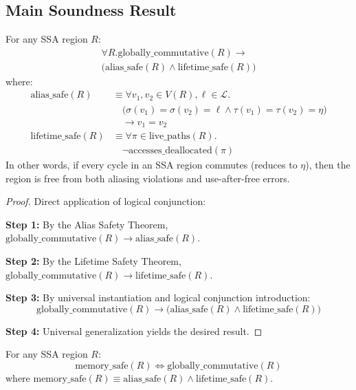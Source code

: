\documentclass[journal]{IEEEtran}
\begin{document}
\subsection{Main Soundness Result}

\begin{theorem}[Soundness]
For any SSA region $R$:
\begin{multline}
\forall R. \text{globally\_commutative}(R) \rightarrow \\
\big( \text{alias\_safe}(R) \land \text{lifetime\_safe}(R) \big)
\end{multline}
where:
\begin{align}
\text{alias\_safe}(R) &\equiv \forall v_1, v_2 \in V(R), \ell \in \mathcal{L}. \nonumber \\
&\quad \big( \sigma(v_1) = \sigma(v_2) = \ell \land \tau(v_1) = \tau(v_2) = \eta \big) \nonumber \\
&\quad \rightarrow v_1 = v_2 \\
\text{lifetime\_safe}(R) &\equiv \forall \pi \in \text{live\_paths}(R). \nonumber \\
&\quad \neg \text{accesses\_deallocated}(\pi)
\end{align}
In other words, if every cycle in an SSA region commutes (reduces to $\eta$), then the region is free from both aliasing violations and use-after-free errors.
\end{theorem}

\begin{proof}
Direct application of logical conjunction:

\textbf{Step 1:} By the Alias Safety Theorem, $\text{globally\_commutative}(R) \rightarrow \text{alias\_safe}(R)$.

\textbf{Step 2:} By the Lifetime Safety Theorem, $\text{globally\_commutative}(R) \rightarrow \text{lifetime\_safe}(R)$.

\textbf{Step 3:} By universal instantiation and logical conjunction introduction:
$$\text{globally\_commutative}(R) \rightarrow \big( \text{alias\_safe}(R) \land \text{lifetime\_safe}(R) \big)$$

\textbf{Step 4:} Universal generalization yields the desired result. 
\end{proof}

\begin{corollary}
\label{cor:characterization}
For any SSA region $R$:
$$\text{memory\_safe}(R) \Leftrightarrow \text{globally\_commutative}(R)$$
where $\text{memory\_safe}(R) \equiv \text{alias\_safe}(R) \land \text{lifetime\_safe}(R)$.
\end{corollary}
\end{document}
